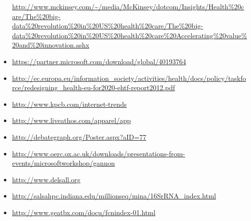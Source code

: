 \begin{itemize}
  \url{http://www.mckinsey.com/~/media/McKinsey/dotcom/Insights/Health\%20care/The\%20big-data\%20revolution\%20in\%20US\%20health\%20care/The\%20big-data\%20revolution\%20in\%20US\%20health\%20care\%20Accelerating\%20value\%20and\%20innovation.ashx}
\item
  \url{https://partner.microsoft.com/download/global/40193764}
\item
  \url{http://ec.europa.eu/information_society/activities/health/docs/policy/taskforce/redesigning_health-eu-for2020-ehtf-report2012.pdf}
\item
  \url{http://www.kpcb.com/internet-trends}
\item
  \url{http://www.liveathos.com/apparel/app}
\item
  \url{http://debategraph.org/Poster.aspx?aID=77}
\item
  \url{http://www.oerc.ox.ac.uk/downloads/presentations-from-events/microsoftworkshop/gannon}
\item
  \url{http://www.delsall.org}
\item
  \url{http://salsahpc.indiana.edu/millionseq/mina/16SrRNA_index.html}
\item
  \url{http://www.geatbx.com/docu/fcnindex-01.html}
\end{itemize}
